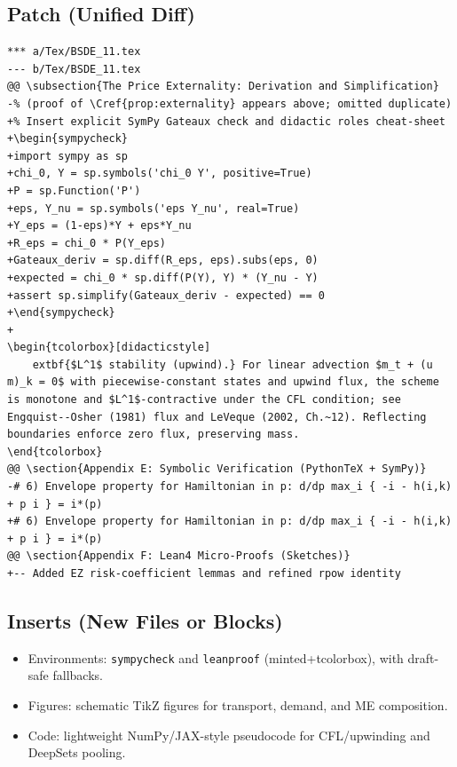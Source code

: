 \documentclass[11pt,letterpaper,oneside]{article}
\numberwithin{equation}{section}
\newenvironment{sympycheck}
    {\VerbatimEnvironment\begin{tcolorbox}[sympycheckstyle]\begin{lstlisting}[language=Python]}
    {\end{lstlisting}\end{tcolorbox}}
\newenvironment{sympycheck}
    {\begin{tcolorbox}[sympycheckstyle]\VerbatimEnvironment\begin{verbatim}}
    {\end{verbatim}\end{tcolorbox}}
\newcommand{\1}{\mathbf{1}}
\begin{document}
\subsection*{Patch (Unified Diff)}
\begin{tcolorbox}[sympycheckstyle,title={Representative Unified Diff (excerpt)}]
\begin{Verbatim}[fontsize=\small]
*** a/Tex/BSDE_11.tex
--- b/Tex/BSDE_11.tex
@@ \subsection{The Price Externality: Derivation and Simplification}
-% (proof of \Cref{prop:externality} appears above; omitted duplicate)
+% Insert explicit SymPy Gateaux check and didactic roles cheat-sheet
+\begin{sympycheck}
+import sympy as sp
+chi_0, Y = sp.symbols('chi_0 Y', positive=True)
+P = sp.Function('P')
+eps, Y_nu = sp.symbols('eps Y_nu', real=True)
+Y_eps = (1-eps)*Y + eps*Y_nu
+R_eps = chi_0 * P(Y_eps)
+Gateaux_deriv = sp.diff(R_eps, eps).subs(eps, 0)
+expected = chi_0 * sp.diff(P(Y), Y) * (Y_nu - Y)
+assert sp.simplify(Gateaux_deriv - expected) == 0
+\end{sympycheck}
+
\begin{tcolorbox}[didacticstyle]
  	extbf{$L^1$ stability (upwind).} For linear advection $m_t + (u m)_k = 0$ with piecewise-constant states and upwind flux, the scheme is monotone and $L^1$-contractive under the CFL condition; see Engquist--Osher (1981) flux and LeVeque (2002, Ch.~12). Reflecting boundaries enforce zero flux, preserving mass.
\end{tcolorbox}
@@ \section{Appendix E: Symbolic Verification (PythonTeX + SymPy)}
-# 6) Envelope property for Hamiltonian in p: d/dp max_i { -i - h(i,k) + p i } = i*(p)
+# 6) Envelope property for Hamiltonian in p: d/dp max_i { -i - h(i,k) + p i } = i*(p)
@@ \section{Appendix F: Lean4 Micro-Proofs (Sketches)}
+-- Added EZ risk-coefficient lemmas and refined rpow identity
\end{Verbatim}
\end{tcolorbox}

\subsection*{Inserts (New Files or Blocks)}
\begin{itemize}[leftmargin=1.2em]
  \item Environments: \texttt{sympycheck} and \texttt{leanproof} (minted+tcolorbox), with draft-safe fallbacks.
  \item Figures: schematic TikZ figures for transport, demand, and ME composition.
  \item Code: lightweight NumPy/JAX-style pseudocode for CFL/upwinding and DeepSets pooling.
\end{itemize}
\end{document}
